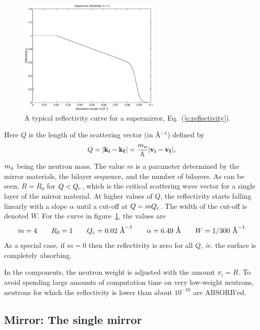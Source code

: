 \begin{figure}
  \begin{center}
    \includegraphics[width=0.6\textwidth]{figures/supermirror.eps}
  \end{center}
\caption{A typical reflectivity curve for a supermirror,
Eq.~(\protect\ref{e:reflectivity}).}
\label{f:reflectivity}
\end{figure}
Here $Q$ is the length of the scattering vector (in \AA$^{-1}$)
defined by
\begin{equation} \label{e:reflectivity}
Q = |{\bf k}_{\bf i} - {\bf k}_{\bf f}| 
  = \frac{m_{\rm n}}{\hbar} |{\bf v}_{\bf i} - {\bf v}_{\bf f}|, 
\end{equation}
$m_{\rm n}$ being the neutron mass. 
The value $m$ is a parameter determined by the mirror materials,
the bilayer sequence, and the number of bilayers.
As can be seen, $R=R_0$ for $Q < Q_{\rm c}$, which is the
critical scattering wave vector for a single layer of the mirror
material. At higher values of $Q$, the reflectivity starts falling
linearly with a slope $\alpha$ until a cut-off at $Q = m Q_{\rm c}$. 
The width of the cut-off is denoted $W$. For the curve in
figure~\ref{f:reflectivity}, the values are
$$ m=4 \qquad R_0=1 \qquad Q_{\rm c} = 0.02\mbox{ \AA}^{-1} \qquad
   \alpha = 6.49\mbox{ \AA} \qquad W=1/300\mbox{ \AA}^{-1} $$
As a special case, if $m=0$ then the reflectivity is zero for all $Q$,
   \textit{ie.} the surface is completely absorbing.

In the components, the neutron weight is adjusted with the amount $\pi_i = R$. 
To avoid spending large amounts of computation time on very low-weight
neutrons, neutrons for which the reflectivity is lower than about
$10^{-10}$ are ABSORB'ed.

\subsection{Mirror: The single mirror}

